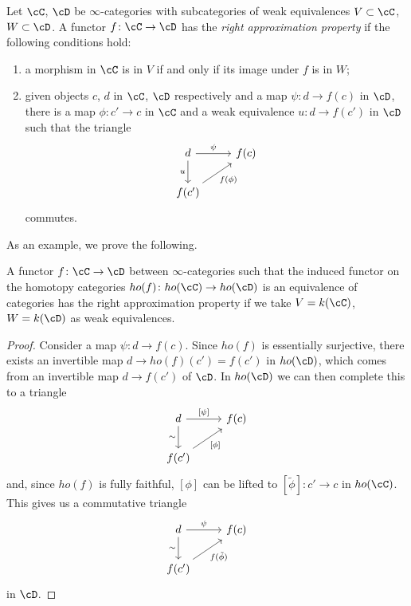 \begin{defn}
  Let $\cC$, $\cD$ be $\infty$-categories with subcategories of weak
  equivalences $V\subset\cC$, $W\subset\cD$. A functor
  $f\colon\cC\rightarrow\cD$ has the \emph{right approximation property} if the
  following conditions hold:
  \begin{enumerate}
    \item a morphism in $\cC$ is in $V$ if and only if its image under $f$ is in
      $W$;
    \item given objects $c$, $d$ in $\cC$, $\cD$ respectively and a map
      $\psi\colon d\rightarrow f(c)$ in $\cD$, there is a map $\phi\colon
      c'\rightarrow c$ in $\cC$ and a weak equivalence $u\colon d\rightarrow
      f(c')$ in $\cD$ such that  the triangle
      \[\begin{tikzcd}
        d & {f(c)} \\
        {f(c')}
        \arrow["\psi", from=1-1, to=1-2]
        \arrow["u"', from=1-1, to=2-1]
        \arrow["{f(\phi)}"', from=2-1, to=1-2]
      \end{tikzcd}\]
      commutes.
  \end{enumerate}
\end{defn}

As an example, we prove the following.

\begin{prop}\label{762}

  A functor $f\colon\cC\rightarrow\cD$ between $\infty$-categories such that the
  induced functor on the homotopy categories $ho(f)\colon ho(\cC)\rightarrow
  ho(\cD)$ is an equivalence of categories has the right approximation property
  if we take $V=k(\cC)$, $W=k(\cD)$ as weak equivalences.
\end{prop}
\begin{proof}
  Consider a map $\psi\colon d\rightarrow f(c)$. Since $ho(f)$ is essentially
  surjective, there exists an invertible map $d\rightarrow ho(f)(c')=f(c')$ in
  $ho(\cD)$, which comes from an invertible map $d\rightarrow f(c')$ of $\cD$.
  In $ho(\cD)$ we can then complete this to a triangle
  \[\begin{tikzcd}
    d & {f(c)} \\
    {f(c')}
    \arrow["{[\psi]}", from=1-1, to=1-2]
    \arrow["\sim"', from=1-1, to=2-1]
    \arrow["{[\phi]}"', from=2-1, to=1-2]
  \end{tikzcd}\]
  and, since $ho(f)$ is fully faithful, $[\phi]$ can be lifted to
  $[\tilde{\phi}]\colon c'\rightarrow c$ in $ho(\cC)$. This gives us a
  commutative triangle
  \[\begin{tikzcd}
    d & {f(c)} \\
    {f(c')}
    \arrow["\psi", from=1-1, to=1-2]
    \arrow["\sim"', from=1-1, to=2-1]
    \arrow["{f(\tilde{\phi})}"', from=2-1, to=1-2]
  \end{tikzcd}\]
  in $\cD$.
\end{proof}

